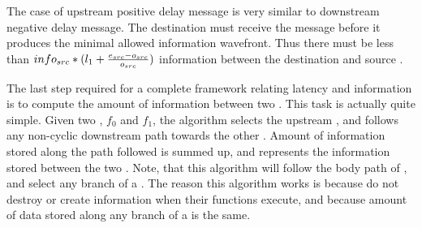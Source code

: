 The case of upstream positive delay message is very similar to
downstream negative delay message.  The destination {\filter} must
receive the message before it produces the minimal allowed
information wavefront.  Thus there must be less than $info_{src}
* (l_1 + {e_{src} - o_{src} \over o_{src}})$ information
between the destination and source {\filters}.

The last step required for a complete framework relating latency
and information is to compute the amount of information between
two {\filters}.  This task is actually quite simple.  Given two
{\filters}, $f_0$ and $f_1$, the algorithm selects the upstream
{\filter}, and follows any non-cyclic downstream path towards the
other {\filter}.  Amount of information stored along the path
followed is summed up, and represents the information stored
between the two {\filters}.  Note, that this algorithm will follow
the body path of {\feedbackloops}, and select any branch of a
{\splitjoin}.  The reason this algorithm works is because {\filters}
do not destroy or create information when their {\work} functions
execute, and because amount of data stored along any branch of a
{\splitjoin} is the same.
